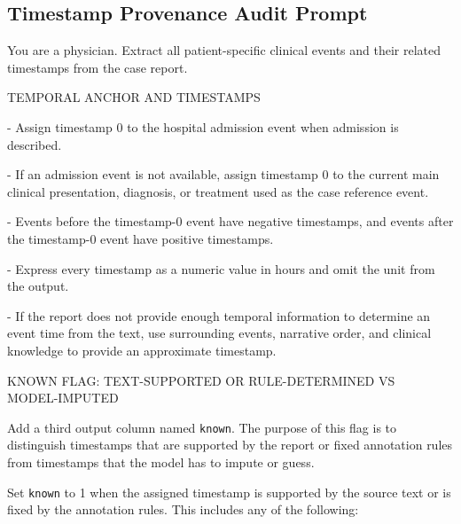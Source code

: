 \subsection{Timestamp Provenance Audit Prompt}
\label{apd:timestamp-provenance-prompt}
\begin{tcolorbox}[
  colback=gray!5,
  colframe=gray!100,
  title={Prompt},
  boxrule=2pt,
  enhanced,
  breakable,                %
  before skip=8pt,          %
  after skip=8pt,           %
  pad at break*=2mm,        %
  fontupper=\scriptsize,
  title after break={{Prompt}} %
]
You are a physician. Extract all patient-specific clinical events and their related timestamps from the case report.

\vspace{1em}
TEMPORAL ANCHOR AND TIMESTAMPS
\vspace{0.2em}

- Assign timestamp 0 to the hospital admission event when admission is described.

- If an admission event is not available, assign timestamp 0 to the current main clinical presentation, diagnosis, or treatment used as the case reference event.

- Events before the timestamp-0 event have negative timestamps, and events after the timestamp-0 event have positive timestamps.

- Express every timestamp as a numeric value in hours and omit the unit from the output.

- If the report does not provide enough temporal information to determine an event time from the text, use surrounding events, narrative order, and clinical knowledge to provide an approximate timestamp.

\vspace{1em}
KNOWN FLAG: TEXT-SUPPORTED OR RULE-DETERMINED VS \\
MODEL-IMPUTED
\vspace{0.2em}

Add a third output column named \texttt{known}. The purpose of this flag is to distinguish timestamps that are supported by the report or fixed annotation rules from timestamps that the model has to impute or guess.

Set \texttt{known} to 1 when the assigned timestamp is supported by the source text or is fixed by the annotation rules. This includes any of the following:


\end{tcolorbox}
